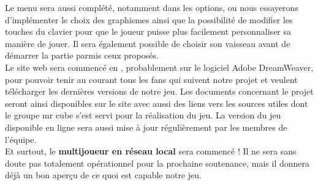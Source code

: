 \documentclass[10pt, titlepage]{report}
\begin{document}
Le menu sera aussi complété, notamment dans les options, ou nous essayerons d'implémenter le choix des graphismes ainsi que la possibilité de modifier les touches du clavier pour que le joueur puisse plus facilement personnaliser sa manière de jouer. Il sera également possible de choisir son vaisseau avant de démarrer la partie parmis ceux proposés.\\

Le site web sera commencé en , probablement sur le logiciel Adobe DreamWeaver, pour pouvoir tenir au courant tous les fans qui suivent notre projet et veulent télécharger les dernières versions de notre jeu. Les documents concernant le projet seront ainsi disponibles sur le site avec aussi des liens vers les sources utiles dont le groupe mr cube s'est servi pour la réalisation du jeu. La version du jeu disponible en ligne sera aussi mise à jour régulièrement par les membres de l'équipe. \\


 Et surtout, le \textbf{multijoueur en réseau local} sera commencé ! Il ne sera sans doute pas totalement opérationnel pour la prochaine soutenance, mais il donnera déjà un bon aperçu de ce quoi est capable notre jeu.
\end{document}
